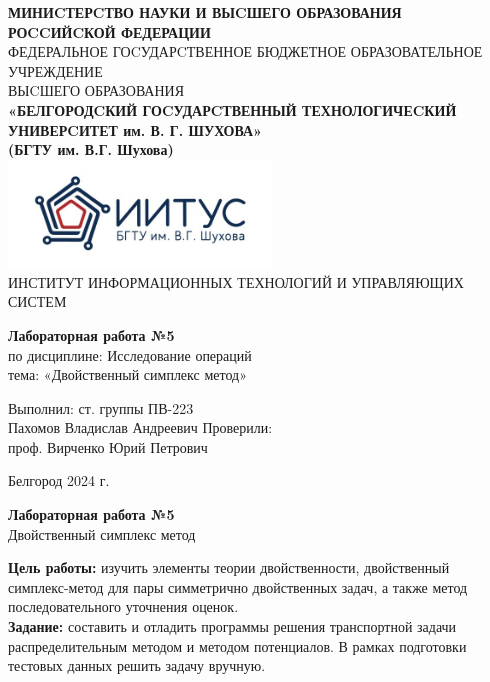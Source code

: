 \documentclass[a4paper,14pt]{extarticle}
\newcommand\textbox[1]{
	\parbox{.45\textwidth}{#1}
}
\begin{document}
\begin{center}
    \small{
        \textbf{МИНИCТЕРCТВО НАУКИ И ВЫCШЕГО ОБРАЗОВАНИЯ РОCCИЙCКОЙ ФЕДЕРАЦИИ}\\
        ФЕДЕРАЛЬНОЕ ГОCУДАРCТВЕННОЕ БЮДЖЕТНОЕ ОБРАЗОВАТЕЛЬНОЕ УЧРЕЖДЕНИЕ\\ВЫCШЕГО ОБРАЗОВАНИЯ \\
        \textbf{«БЕЛГОРОДCКИЙ ГОCУДАРCТВЕННЫЙ ТЕХНОЛОГИЧЕCКИЙ\\УНИВЕРCИТЕТ им. В. Г. ШУХОВА»\\ (БГТУ им. В.Г. Шухова)} \\
        \bigbreak
        \includegraphics[width=70mm]{log}\\
        ИНСТИТУТ ИНФОРМАЦИОННЫХ ТЕХНОЛОГИЙ И УПРАВЛЯЮЩИХ СИСТЕМ\\}
\end{center}

\vfill
\begin{center}
    \large{
        \textbf{
            Лабораторная работа №5}}\\
    \normalsize{
        по дисциплине: Исследование операций \\
        тема: «Двойственный симплекс метод»}
\end{center}
\vfill
\hfill\textbox{
    Выполнил: ст. группы ПВ-223\\Пахомов Владислав Андреевич
    \bigbreak
    Проверили: \\проф. Вирченко Юрий Петрович
}
\vfill\begin{center}
    Белгород 2024 г.
\end{center}
\newpage
\begin{center}
    \textbf{Лабораторная работа №5}\\
    Двойственный симплекс метод\\
\end{center}
\textbf{Цель работы: }изучить элементы теории двойственности,
двойственный симплекс-метод для пары симметрично двойственных
задач, а также метод последовательного уточнения оценок.\\

\textbf{Задание: }составить и отладить программы решения транспортной задачи
распределительным методом и методом потенциалов. В рамках
подготовки тестовых данных решить задачу вручную.
\end{document}
